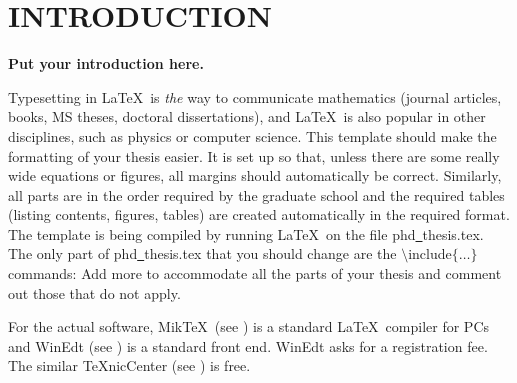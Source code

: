 
\chapter{INTRODUCTION}\label{chap1:introduction}

{\bf Put your introduction here.}


Typesetting in \LaTeX \ is {\em the} way to communicate mathematics
(journal articles, books, MS theses, doctoral dissertations),
and \LaTeX \ is also popular in other disciplines, such as 
physics or computer science.
This template should make the formatting of your 
thesis easier. It is set up so that, unless
there are some really wide equations or figures, 
all margins should automatically be correct.
Similarly, all parts are in the order required by the graduate school and 
the required tables (listing contents, figures, tables)
are created automatically in the required format. 
The template is being compiled by running \LaTeX \ on 
the file phd\underline{~}thesis.tex.
The only part of 
phd\underline{~}thesis.tex
that you should change are the 
$\setminus $include$\{ \ldots \} $
commands:
Add more to accommodate all the parts of your thesis
and comment out those that do not apply. 


For the actual software, Mik\TeX \ (see \cite{MiKTeX})
is a standard \LaTeX \ compiler for PCs and
WinEdt (see \cite{WinEdt}) is a standard front end.
WinEdt asks for a registration fee. 
The similar \TeX nicCenter (see \cite{TeXnicCenter})
is free. 


